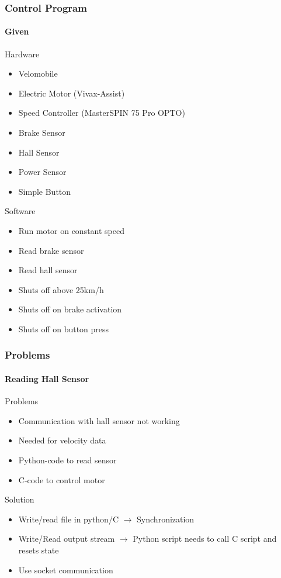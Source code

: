 \documentclass[8pt]{beamer}
\begin{document}
\begin{frame}
	\frametitle{Control Program}
	\framesubtitle{Given}
	\begin{block}{Hardware}
		\begin{itemize}
			\item Velomobile
			\item Electric Motor (Vivax-Assist)
			\item Speed Controller (MasterSPIN 75 Pro OPTO)
			\item Brake Sensor
			\item Hall Sensor
			\item Power Sensor
			\item Simple Button
		\end{itemize}
	\end{block}	
	\pause
	\begin{block}{Software}
		\begin{itemize}
			\item Run motor on constant speed
			\item Read brake sensor
			\item Read hall sensor
			\item Shuts off above 25km/h
			\item Shuts off on brake activation
			\item Shuts off on button press
		\end{itemize}
	\end{block}		
\end{frame}

\begin{frame}
	\frametitle{Problems}
	\framesubtitle{Reading Hall Sensor}
	\begin{block}{Problems}
	\begin{itemize}
		\item Communication with hall sensor not working
		\item Needed for velocity data
		\item Python-code to read sensor
		\item C-code to control motor
	\end{itemize}		
	\end{block}
	\pause
	\begin{block}{Solution}
		\begin{itemize}[<+->]
			\item Write/read file in python/C $\rightarrow$ Synchronization
			\item Write/Read output stream $\rightarrow$ Python script needs to call C script and resets state
			\item Use socket communication
		\end{itemize}
	\end{block}
\end{frame}
\end{document}
